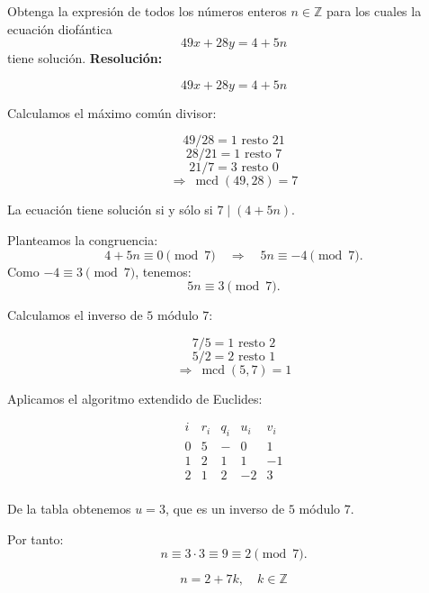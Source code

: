 \documentclass[a4paper,12pt]{article}
\begin{document}
\begin{ejercicio}[title=Ejercicio 34]
Obtenga la expresión de todos los números enteros $n \in \mathbb{Z}$ para los cuales la ecuación diofántica
\[
49x + 28y = 4 + 5n
\]
tiene solución.
\tcblower
\textbf{Resolución:}

\[
49x + 28y = 4 + 5n
\]

Calculamos el máximo común divisor:

\[
49 / 28 = 1 \text{ resto } 21
\]
\[
28 / 21 = 1 \text{ resto } \boxed{7}
\]
\[
21 / 7 = 3 \text{ resto } 0
\]
\[
\Rightarrow \ \operatorname{mcd}(49,28) = \boxed{7}
\]

La ecuación tiene solución si y sólo si $7 \mid (4 + 5n)$.

\vspace{0.5em}

Planteamos la congruencia:
\[
4 + 5n \equiv 0 \pmod{7} \quad \Rightarrow \quad 5n \equiv -4 \pmod{7}.
\]
Como $-4 \equiv 3 \pmod{7}$, tenemos:
\[
5n \equiv 3 \pmod{7}.
\]

Calculamos el inverso de $5$ módulo $7$:

\[
7 / 5 = 1 \text{ resto } 2
\]
\[
5 / 2 = 2 \text{ resto } \boxed{1}
\]
\[
\Rightarrow \ \operatorname{mcd}(5,7) = \boxed{1}
\]

Aplicamos el algoritmo extendido de Euclides:

\[
\begin{array}{c|c|c|c|c}
i & r_i & q_i & u_i & v_i \\ \hline
0 & 5 & - & 0 & 1 \\
1 & 2 & 1 & 1 & -1 \\
2 & \boxed{1} & 2 & -2 & 3 \\
\end{array}
\]

De la tabla obtenemos $u = 3$, que es un inverso de $5$ módulo $7$.

\vspace{0.5em}

Por tanto:
\[
n \equiv 3 \cdot 3 \equiv 9 \equiv 2 \pmod{7}.
\]

\[
\boxed{n = 2 + 7k, \quad k \in \mathbb{Z}}
\]
\end{ejercicio}
\end{document}

